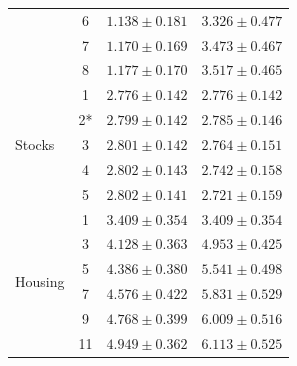 \documentclass{article}
\newcommand{\f}[1]{\bm{#1}}
\begin{document}
\begin{table}
\begin{center}
{\begin{tabular}{lccc}
                             & 6  & $  {1.138 \pm 0.181}$ & $\f{ 3.326 \pm 0.477}$\\
                             & 7  & $  {1.170 \pm 0.169}$ & $\f{ 3.473 \pm 0.467}$\\
                             & 8  & $  {1.177 \pm 0.170}$ & $\f{ 3.517 \pm 0.465}$\\\hline
    \multirow{5}{*}{Stocks}  & 1  & $\f{2.776 \pm 0.142}$ & $  { 2.776 \pm 0.142}$\\
                             & 2*  & $\f{2.799 \pm 0.142}$ & $  { 2.785 \pm 0.146}$\\
                             & 3  & $\f{2.801 \pm 0.142}$ & $  { 2.764 \pm 0.151}$\\
                             & 4  & $\f{2.802 \pm 0.143}$ & $  { 2.742 \pm 0.158}$\\
                             & 5  & $\f{2.802 \pm 0.141}$ & $  { 2.721 \pm 0.159}$\\\hline
    \multirow{6}{*}{Housing} & 1  & $\f{3.409 \pm 0.354}$ & $\f{ 3.409 \pm 0.354}$\\
                             & 3  & $  {4.128 \pm 0.363}$ & $\f{ 4.953 \pm 0.425}$\\
                             & 5  & $  {4.386 \pm 0.380}$ & $\f{ 5.541 \pm 0.498}$\\
                             & 7  & $  {4.576 \pm 0.422}$ & $\f{ 5.831 \pm 0.529}$\\
                             & 9  & $  {4.768 \pm 0.399}$ & $\f{ 6.009 \pm 0.516}$\\
                             & 11 & $  {4.949 \pm 0.362}$ & $\f{ 6.113 \pm 0.525}$\\\hline
  \end{tabular}}
  \end{center}
\end{table}
\end{document}
